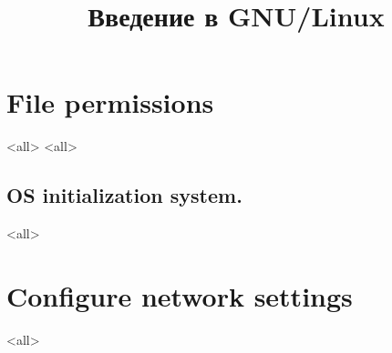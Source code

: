 

\title{Введение в GNU/Linux}





\begin{frame}
	\frametitle{}
	\titlepage
	\vspace{-0.5cm}
	\begin{center}
	\end{center}
\end{frame}



\section{File permissions}
\mode<all>{}
\mode<all>{}
\subsection{OS initialization system.}
\mode<all>{}


\section{Configure network settings}
\mode<all>{}


